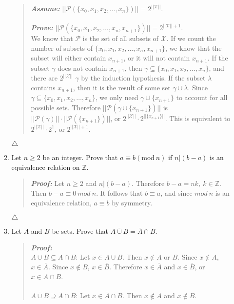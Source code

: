\documentclass{article}
\newcommand{\Proof}{\textit{\textbf{Proof: }}}
\newcommand{\ZZ}{\mathbb{Z}}
\begin{document}
\begin{enumerate}
\begin{enumerate}
\begin{quote}
\textit{\textbf{Assume:}} $||\mathcal{P}(\{x_{0}, x_{1}, x_{2}, \ldots, x_{n}\})|| = 2^{||\mathcal{X}||}$. \\\\
\textit{\textbf{Prove:}} $||\mathcal{P}(\{x_{0}, x_{1}, x_{2}, \ldots,x_{n}, x_{n+1}\})|| = 2^{||\mathcal{X}|| + 1}$.\\
We know that $\mathcal{P}$ is the set of all subsets of $\mathcal{X}$. 
If we count the number of subsets of $\{x_{0}, x_{1}, x_{2},\ldots,x_{n},x_{n+1}\}$, we know that the subset will either contain $x_{n+1}$, or it will not contain $x_{n+1}$.
If the subset $\gamma$ does not contain $x_{n+1}$, then $\gamma \subseteq \{x_{0},x_{1},x_{2},\ldots,x_{n}\}$, and there are $2^{||\mathcal{X}||}$ $\gamma$ by the induction hypothesis.
If the subset $\lambda$ contains $x_{n+1}$, then it is the result of some set $\gamma \cup \lambda$.
Since $\gamma \subseteq\{x_{0},x_{1},x_{2},\ldots,x_{n}\}$, we only need $\gamma \cup \{x_{n+1}\}$ to account for all possible sets.
Therefore $||\mathcal{P}(\gamma \cup \{x_{n+1}\})||$ is $||\mathcal{P}(\gamma)|| \cdot ||\mathcal{P}(\{x_{n+1}\})||$, or $2^{||\mathcal{X}||} \cdot 2^{||\{x_{n+1}\}||}$.
This is equivalent to $2^{||\mathcal{X}||}\cdot2^{1}$, or $2^{||\mathcal{X}|| + 1}$.
\end{quote}
$\triangle$
\item Let $n \geq 2$ be an integer.
Prove that $a \equiv b(\text{mod}\ n)$ if $n|(b-a)$ is an equivalence relation on $\ZZ$.
\begin{quote}
\Proof Let $n \geq 2$ and $n | (b - a)$.
Therefore $b - a  = nk,\ k\in\ZZ$.
Then $b - a \equiv 0\ mod\ n$.
It follows that $b \equiv a$, and since $mod\ n$ is an equivalence relation, $a \equiv b$ by symmetry.
\end{quote}
$\triangle$
\item Let $A$ and $B$ be sets.
Prove that $\overline{A \cup B} = \overline{A} \cap \overline{B}$.
\begin{quote}
\Proof\\ 
{$\overline{A \cup B} \subseteq \overline{A} \cap \overline{B}$:} 
Let $x\in\overline{A \cup B}$.
Then $x \notin A$ or $B$.
Since $x \notin A$, $x \in \overline{A}$.
Since $x \notin B$, $x \in \overline{B}$.
Therefore $x \in \overline{A}$ and $x\in\overline{B}$, or $x \in \overline{A} \cap \overline{B}$.\\\\
{$\overline{A \cup B} \supseteq \overline{A} \cap \overline{B}$:} 
Let $x\in\overline{A} \cap \overline{B}$.
Then $x \notin A$ and $x \notin B$.

\end{quote}
\end{enumerate}
\end{enumerate}
\end{document}
